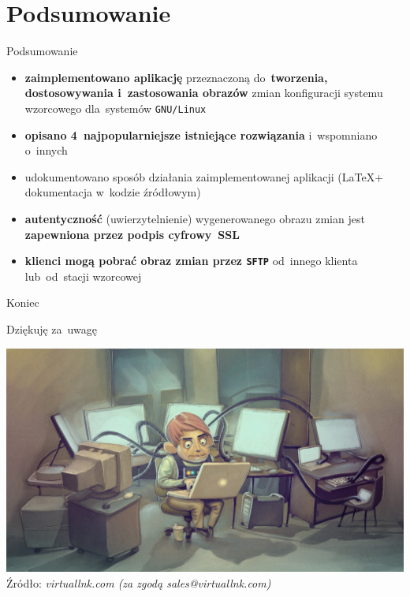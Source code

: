 \documentclass[notes,polish,xcolor=dvipsnames,aspectratio=169]{beamer}
\begin{document}

\section{Podsumowanie}

\begin{frame}{Podsumowanie}

\begin{itemize}
	\item \textbf{zaimplementowano aplikację} przeznaczoną do~\textbf{tworzenia, dostosowywania i~zastosowania obrazów} zmian konfiguracji systemu wzorcowego dla~systemów \texttt{GNU/Linux}
	\item \textbf{opisano 4~najpopularniejsze istniejące rozwiązania} i~wspomniano o~innych
	\item udokumentowano sposób działania zaimplementowanej aplikacji (\LaTeX + dokumentacja w~kodzie źródłowym)
	\item \textbf{autentyczność} (uwierzytelnienie) wygenerowanego obrazu zmian jest \textbf{zapewniona przez podpis cyfrowy~SSL}
	\item \textbf{klienci mogą pobrać obraz zmian przez \texttt{SFTP}} od~innego klienta lub~od~stacji wzorcowej
\end{itemize}

\end{frame}


\begin{frame}{Koniec}

\begin{center}
	\Large Dziękuję za~uwagę\\[0.6em]
	\begin{minipage}{1.2\textheight}
		\includegraphics[width=\linewidth]{img/busy-admin}\\
		\raggedleft\color{gray}\tiny Źródło: \emph{virtuallnk.com (za zgodą sales@virtuallnk.com)}
	\end{minipage}
\end{center}

\end{frame}

\end{document}

